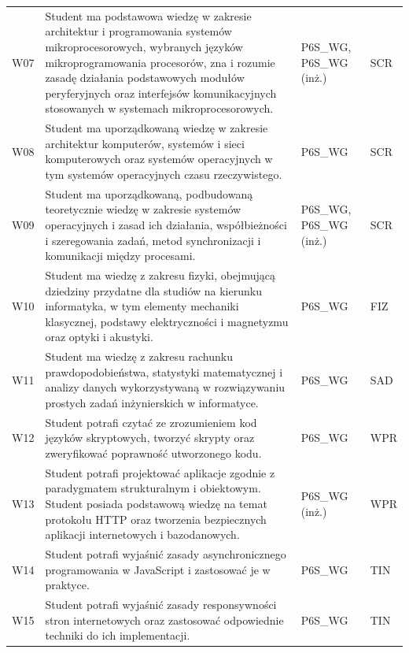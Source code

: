 \documentclass[12pt,a4paper]{article}
\begin{document}
{\begin{longtable}{m{1cm}m{8.8cm}m{2.1cm}m{2.5cm}}
\rowcolor{tableRowLight} W07 & Student ma podstawowa wiedzę w zakresie architektur i programowania systemów mikroprocesorowych, wybranych języków mikroprogramowania procesorów, zna i rozumie zasadę działania podstawowych modułów peryferyjnych oraz interfejsów komunikacyjnych stosowanych w systemach mikroprocesorowych. & {\scriptsize P6S\_WG, P6S\_WG {\scriptsize (inż.)}} & {\scriptsize SCR} \\
\rowcolor{tableRowAlt} W08 & Student ma uporządkowaną wiedzę w zakresie architektur komputerów, systemów i sieci komputerowych oraz systemów operacyjnych w tym systemów operacyjnych czasu rzeczywistego. & {\scriptsize P6S\_WG} & {\scriptsize SCR} \\
\rowcolor{tableRowLight} W09 & Student ma uporządkowaną, podbudowaną teoretycznie wiedzę w zakresie systemów operacyjnych i zasad ich działania, współbieżności i szeregowania zadań, metod synchronizacji i komunikacji między procesami. & {\scriptsize P6S\_WG, P6S\_WG {\scriptsize (inż.)}} & {\scriptsize SCR} \\
\rowcolor{tableRowAlt} W10 & Student ma wiedzę z zakresu fizyki, obejmującą dziedziny przydatne dla studiów na kierunku informatyka, w tym elementy mechaniki klasycznej, podstawy elektryczności i magnetyzmu oraz optyki i akustyki. & {\scriptsize P6S\_WG} & {\scriptsize FIZ} \\
\rowcolor{tableRowLight} W11 & Student ma wiedzę z zakresu rachunku prawdopodobieństwa, statystyki matematycznej i analizy danych wykorzystywaną w rozwiązywaniu prostych zadań inżynierskich w informatyce. & {\scriptsize P6S\_WG} & {\scriptsize SAD} \\
\rowcolor{tableRowAlt} W12 & Student potrafi czytać ze zrozumieniem kod języków skryptowych, tworzyć skrypty oraz zweryfikować poprawność utworzonego kodu. & {\scriptsize P6S\_WG} & {\scriptsize WPR} \\
\rowcolor{tableRowLight} W13 & Student potrafi projektować aplikacje zgodnie z paradygmatem strukturalnym i obiektowym. Student posiada podstawową wiedzę na temat protokołu HTTP oraz tworzenia bezpiecznych aplikacji internetowych i bazodanowych. & {\scriptsize P6S\_WG {\scriptsize (inż.)}} & {\scriptsize WPR} \\
\rowcolor{tableRowAlt} W14 & Student potrafi wyjaśnić zasady asynchronicznego programowania w JavaScript i zastosować je w praktyce. & {\scriptsize P6S\_WG} & {\scriptsize TIN} \\
\rowcolor{tableRowLight} W15 & Student potrafi wyjaśnić zasady responsywności stron internetowych oraz zastosować odpowiednie techniki do ich implementacji. & {\scriptsize P6S\_WG} & {\scriptsize TIN} \\

\end{longtable}}
\end{document}
